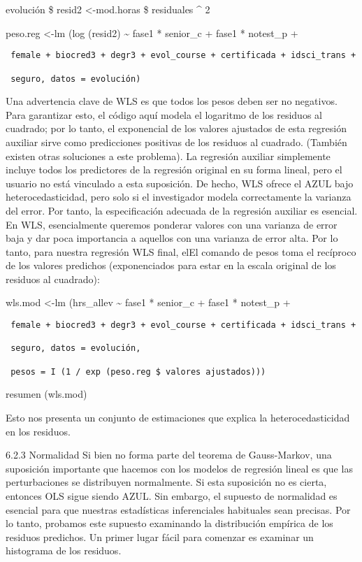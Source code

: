 \documentclass[
]{book}
\begin{document}
evolución \$ resid2 \textless-mod.horas \$ residuales \^{} 2

peso.reg \textless-lm (log (resid2) \textasciitilde{} fase1 * senior\_c + fase1 * notest\_p +

\begin{verbatim}
 female + biocred3 + degr3 + evol_course + certificada + idsci_trans +

 seguro, datos = evolución)
\end{verbatim}

Una advertencia clave de WLS es que todos los pesos deben ser no negativos. Para garantizar esto, el código aquí modela el logaritmo de los residuos al cuadrado; por lo tanto, el exponencial de los valores ajustados de esta regresión auxiliar sirve como predicciones positivas de los residuos al cuadrado. (También existen otras soluciones a este problema). La regresión auxiliar simplemente incluye todos los predictores de la regresión original en su forma lineal, pero el usuario no está vinculado a esta suposición. De hecho, WLS ofrece el AZUL bajo heterocedasticidad, pero solo si el investigador modela correctamente la varianza del error. Por tanto, la especificación adecuada de la regresión auxiliar es esencial. En WLS, esencialmente queremos ponderar valores con una varianza de error baja y dar poca importancia a aquellos con una varianza de error alta. Por lo tanto, para nuestra regresión WLS final, elEl comando de pesos toma el recíproco de los valores predichos (exponenciados para estar en la escala original de los residuos al cuadrado):

wls.mod \textless-lm (hrs\_allev \textasciitilde{} fase1 * senior\_c + fase1 * notest\_p +

\begin{verbatim}
 female + biocred3 + degr3 + evol_course + certificada + idsci_trans +

 seguro, datos = evolución,

 pesos = I (1 / exp (peso.reg $ valores ajustados)))
\end{verbatim}

resumen (wls.mod)

Esto nos presenta un conjunto de estimaciones que explica la heterocedasticidad en los residuos.

6.2.3 Normalidad
Si bien no forma parte del teorema de Gauss-Markov, una suposición importante que hacemos con los modelos de regresión lineal es que las perturbaciones se distribuyen normalmente. Si esta suposición no es cierta, entonces OLS sigue siendo AZUL. Sin embargo, el supuesto de normalidad es esencial para que nuestras estadísticas inferenciales habituales sean precisas. Por lo tanto, probamos este supuesto examinando la distribución empírica de los residuos predichos. Un primer lugar fácil para comenzar es examinar un histograma de los residuos.
\end{document}
